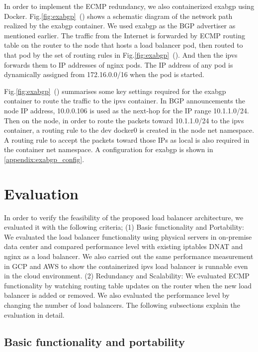 In order to implement the ECMP redundancy, we also containerized exabgp using Docker.
Fig.\ref{fig:exabgp}~() shows a schematic diagram of the network path realized by the exabgp container.
We used exabgp as the BGP advertiser as mentioned earlier.
The traffic from the Internet is forwarded by ECMP routing table on the router to the node that hosts a load balancer pod, then routed to that pod by the set of routing rules in Fig.\ref{fig:exabgp}~(). 
And then the ipvs forwards them to IP addresses of nginx pods.
The IP address of any pod is dynamically assigned from 172.16.0.0/16 when the pod is started. 

Fig.\ref{fig:exabgp}~() summarises some key settings required for the exabgp container to route the traffic to the ipvs container.
In BGP announcements the node IP address, 10.0.0.106 is used as the next-hop for the IP range 10.1.1.0/24.
Then on the node, in order to route the packets toward 10.1.1.0/24 to the ipvs container, 
a routing rule to the dev docker0 is created in the node net namespace. 
A routing rule to accept the packets toward those IPs as local is also required in the container net namespace. 
A configuration for exabgp is shown in \ref{appendix:exabgp_config}.


\section{Evaluation}\label{Evaluation}

In order to verify the feasibility of the proposed load balancer architecture, we evaluated it with the following criteria;
(1) Basic functionality and Portability:
We evaluated the load balancer functionality using physical servers in on-premise data center and compared performance level with existing iptables DNAT and nginx as a load balancer.
We also carried out the same performance measurement in GCP and AWS to show the containerized ipvs load balancer is runnable even in the cloud environment.
(2) Redundancy and Scalability:
We evaluated ECMP functionality by watching routing table updates on the router when the new load balancer is added or removed.
We also evaluated the performance level by changing the number of load balancers.
%
The following subsections explain the evaluation in detail.

\subsection{Basic functionality and portability}

